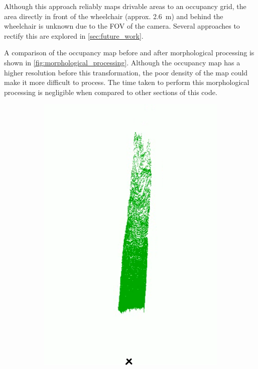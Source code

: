 Although this approach reliably maps drivable areas to an occupancy grid,
the area directly in front of the wheelchair (approx. \SI{2.6}{\metre}) and behind the wheelchair is unknown due to the FOV of the camera.
Several approaches to rectify this are explored in \cref{sec:future_work}.

A comparison of the occupancy map before and after morphological processing is shown in \cref{fig:morphological_processing}.
Although the occupancy map has a higher resolution before this transformation, the poor density of the map
could make it more difficult to process. The time taken to perform this morphological processing is negligible
when compared to other sections of this code.

\begin{figure}[b]
    \centering
    \begin{subfigure}{.4\textwidth}
        \centering
        \includegraphics[width=\linewidth,frame]{images/occupancy_map1_nomorph.png}

\end{subfigure}
\end{figure}
